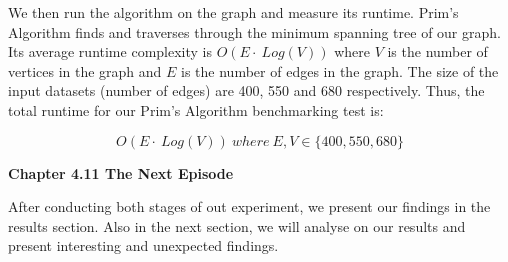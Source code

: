 We then run the algorithm on the graph and measure its runtime. Prim's Algorithm finds and traverses through the minimum spanning tree of our graph. Its average runtime complexity is \(O(E\cdot\ Log(V))\) where \(V\) is the number of vertices in the graph and \(E\) is the number of edges in the graph. The size of the input datasets (number of edges) are 400, 550 and 680 respectively. Thus, the total runtime for our Prim’s Algorithm benchmarking test is:

\[ O(E\cdot\ Log(V))\ where\ E, V \in \{400, 550, 680\} \]

\bigskip
\textbf{{\Large Chapter 4.11 The Next Episode}}

After conducting both stages of out experiment, we present our findings in the results section. Also in the next section, we will analyse on our results and present interesting and unexpected findings.